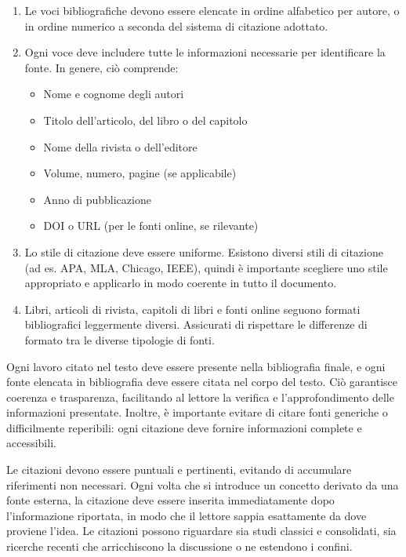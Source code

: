 \documentclass[9pt,a4paper,twoside]{rho-class/rho}
\begin{document}
\begin{enumerate}
	\item Le voci bibliografiche devono essere elencate in ordine alfabetico per autore, o in ordine numerico a seconda del sistema di citazione adottato.
	\item Ogni voce deve includere tutte le informazioni necessarie per identificare la fonte. In genere, ciò comprende:
    \begin{itemize}
	\item Nome e cognome degli autori
	\item Titolo dell’articolo, del libro o del capitolo
	\item Nome della rivista o dell’editore
	\item Volume, numero, pagine (se applicabile)
	\item Anno di pubblicazione
	\item DOI o URL (per le fonti online, se rilevante)
     \end{itemize}
	\item Lo stile di citazione deve essere uniforme. Esistono diversi stili di citazione (ad es. APA, MLA, Chicago, IEEE), quindi è importante scegliere uno stile appropriato e applicarlo in modo coerente in tutto il documento.
	\item Libri, articoli di rivista, capitoli di libri e fonti online seguono formati bibliografici leggermente diversi. Assicurati di rispettare le differenze di formato tra le diverse tipologie di fonti.
\end{enumerate}

Ogni lavoro citato nel testo deve essere presente nella bibliografia finale, e ogni fonte elencata in bibliografia deve essere citata nel corpo del testo. Ciò garantisce coerenza e trasparenza, facilitando al lettore la verifica e l’approfondimento delle informazioni presentate. Inoltre, è importante evitare di citare fonti generiche o difficilmente reperibili: ogni citazione deve fornire informazioni complete e accessibili.

Le citazioni devono essere puntuali e pertinenti, evitando di accumulare riferimenti non necessari. Ogni volta che si introduce un concetto derivato da una fonte esterna, la citazione deve essere inserita immediatamente dopo l’informazione riportata, in modo che il lettore sappia esattamente da dove proviene l’idea. Le citazioni possono riguardare sia studi classici e consolidati, sia ricerche recenti che arricchiscono la discussione o ne estendono i confini.
\end{document}
